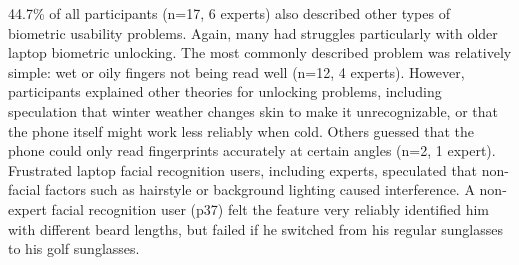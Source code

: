44.7\% of all participants (n=17, 6 experts) also described other types of biometric usability problems. Again, many had struggles particularly with older laptop biometric unlocking. The most commonly described problem was relatively simple: wet or oily fingers not being read well (n=12, 4 experts). However, participants explained other theories for unlocking problems, including speculation that winter weather changes skin to make it unrecognizable, or that the phone itself might work less reliably when cold. Others guessed that the phone could only read fingerprints accurately at certain angles (n=2, 1 expert). Frustrated laptop facial recognition users, including experts, speculated that non-facial factors such as hairstyle or background lighting caused interference. A non-expert facial recognition user (p37) felt the feature very reliably identified him with different beard lengths, but failed if he switched from his regular sunglasses to his golf sunglasses.


